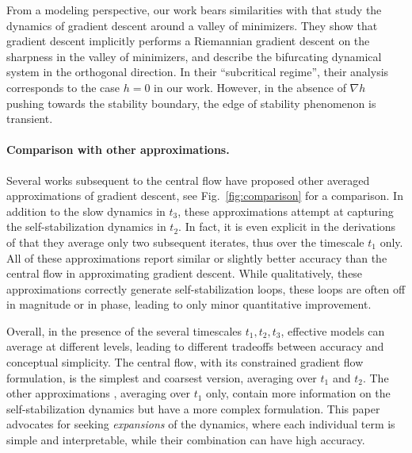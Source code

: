\documentclass[11pt,english,reqno]{article}
\theoremstyle{plain}
\theoremstyle{definition}
\theoremstyle{remark}
\numberwithin{equation}{section}
\begin{document}

From a modeling perspective, our work bears similarities with \cite{macdonald2026convergence,macdonald2026dynamics} that study the dynamics of gradient descent around a valley of minimizers. They show that gradient descent implicitly performs a Riemannian gradient descent on the sharpness in the valley of minimizers, and describe the bifurcating dynamical system in the orthogonal direction. In their ``subcritical regime'', their analysis corresponds to the case $h=0$ in our work. However, in the absence of $\nabla h$ pushing towards the stability boundary, the edge of stability phenomenon is transient.

\paragraph{Comparison with other approximations.} Several works \cite{regis2026rod,marion2026edge,de2026gradient} subsequent to the central flow \cite{cohen2024understanding} have proposed other averaged approximations of gradient descent, see Fig.~\ref{fig:comparison} for a comparison. In addition to the slow dynamics in $t_3$, these approximations attempt at capturing the self-stabilization dynamics in $t_2$. In fact, it is even explicit in the derivations of \cite{regis2026rod,marion2026edge} that they average only two subsequent iterates, thus over the timescale $t_1$ only. All of these approximations report similar or slightly better accuracy than the central flow in approximating gradient descent. While qualitatively, these approximations correctly generate self-stabilization loops, these loops are often off in magnitude or in phase, leading to only minor quantitative improvement. 

Overall, in the presence of the several timescales $t_1, t_2, t_3$, effective models can average at different levels, leading to different tradeoffs between accuracy and conceptual simplicity. The central flow, with its constrained gradient flow formulation, is the simplest and coarsest version, averaging over $t_1$ and $t_2$. The other approximations \cite{regis2026rod,marion2026edge,de2026gradient}, averaging over $t_1$ only, contain more information on the self-stabilization dynamics but have a more complex formulation. This paper advocates for seeking \emph{expansions} of the dynamics, where each individual term is simple and interpretable, while their combination can have high accuracy. 
\end{document}
